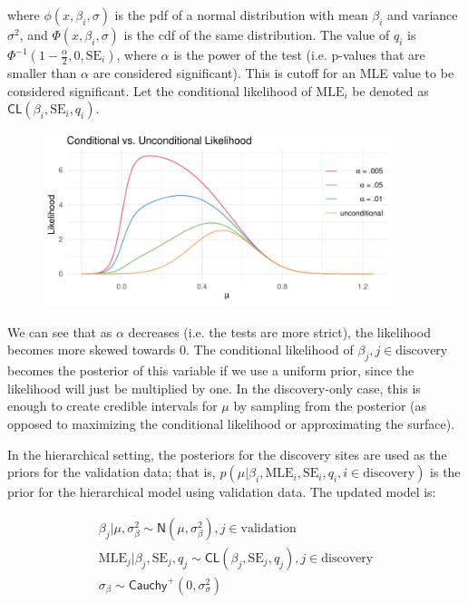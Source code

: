 \documentclass[AMA,STIX1COL]{WileyNJD-v2}\usepackage[]{graphicx}\usepackage[]{color}
\newenvironment{knitrout}{}{} %
\begin{document}
where $\phi(x, \beta_i, \sigma)$ is the pdf of a normal distribution with mean $\beta_i$ and variance $\sigma^2$, and $\Phi(x, \beta_i, \sigma)$ is the cdf of the same distribution. The value of $q_i$ is $\Phi^{-1}(1-\frac{\alpha}{2}, 0 ,\text{SE}_i)$, where $\alpha$ is the power of the test (i.e. p-values that are smaller than $\alpha$ are considered significant). This is cutoff for an MLE value to be considered significant. Let the conditional likelihood of $\text{MLE}_i$  be denoted as $\textsf{CL}(\beta_i,\text{SE}_i, q_i)$.




\begin{figure}
\begin{knitrout}
\color{fgcolor}

{\centering \includegraphics[width=4in]{figure/unnamed-chunk-3-1} 

}



\end{knitrout}
\end{figure}
We can see that as $\alpha$ decreases (i.e. the tests are more strict), the likelihood becomes more skewed towards 0. The conditional likelihood of $\beta_{ j}, j\in \text{discovery}$ becomes the posterior of this variable if we use a uniform prior, since the likelihood will just be multiplied by one. In the discovery-only case, this is enough to create credible intervals for $\mu$ by sampling from the posterior (as opposed to maximizing the conditional likelihood or approximating the surface).


In the hierarchical setting, the posteriors for the discovery sites are used as the priors for the validation data; that is, $p(\mu| \beta_i, \text{MLE}_i,\text{SE}_i, q_i, i \in  \text{discovery})$ is the prior for the hierarchical model using validation data. The updated model is:

\begin{gather} \label{eq6}
\beta_{j}|\mu, \sigma_{\beta}^{2} \sim \textsf{N}(\mu, \sigma_{\beta}^{2}) , j \in \text{validation}\\
\text{MLE}_{j}|\beta_{j},\text{SE}_{j}, q_j \sim \textsf{CL}(\beta_{j},\text{SE}_{j}, q_j) , j \in \text{discovery}\\
\sigma_{\beta}\sim \textsf{Cauchy}^+(0,\sigma^2_{\sigma})
\end{gather}
\end{document}
